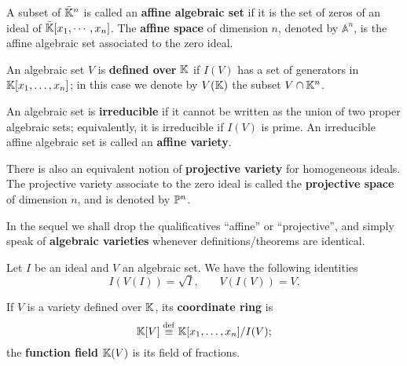  A subset of $\bar{\mathbb{K}}^n$ is called an
\textbf{affine algebraic set} if it is the
set of zeros of an ideal of $\bar{\mathbb{K}}[x_1,\cdots,x_n]$.  The
\textbf{affine space} of dimension $n$, denoted by
$\mathbb{A}^n$, is the affine algebraic set associated to the zero
ideal.

An algebraic set $V$ is
\textbf{defined over} $\mathbb{K}$
if $I(V)$ has a set of generators in $\mathbb{K}[x_1,\ldots,x_n]$; in this
case we denote by $V(\mathbb{K})$ the subset $V\cap\mathbb{K}^n$.

An algebraic set is
\textbf{irreducible} if it cannot be
written as the union of two proper algebraic sets; equivalently, it is
irreducible if $I(V)$ is prime. An irreducible affine algebraic set is
called an \textbf{affine variety}.

There is also an equivalent notion of
\textbf{projective variety} for homogeneous
ideals. The projective variety associate to the zero ideal is called
the \textbf{projective space} of dimension $n$,
and is denoted by $\mathbb{P}^n$.

In the sequel we shall drop the qualificatives ``affine'' or
``projective'', and simply speak of
\textbf{algebraic varieties} whenever
definitions/theorems are identical.


\begin{theorem}[Nullstellensatz]
  Let $I$ be an ideal and $V$ an algebraic set. We have the following
  identities
  \begin{equation}
    \label{eq:217}
    I(V(I)) = \sqrt{I}
    \text{,}\qquad
    V(I(V)) = V
    \text{.}
  \end{equation}
\end{theorem}

If $V$ is a variety defined over $\mathbb{K}$, its
\textbf{coordinate
  ring} is
\begin{equation}
  \label{eq:218}
  \mathbb{K}[V] \overset{\mathrm{def}}{\equiv} \mathbb{K}[x_1,\ldots,x_n]/I(V)
  \text{;}
\end{equation}
the \textbf{function field}
$\mathbb{K}(V)$ is its field of fractions. 

